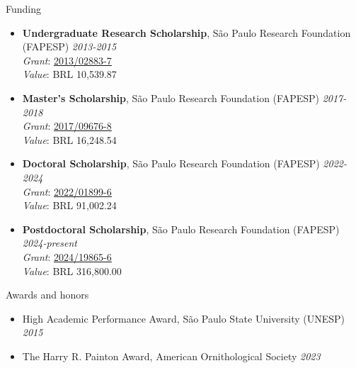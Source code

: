\documentclass{resume}
\begin{document}

\begin{rSection}{Funding} 
\begin{itemize}
\item {\bf Undergraduate Research Scholarship}{, São Paulo Research Foundation (FAPESP)
} \hfill{\em 2013-2015}\\
{\it Grant}: \href{https://bv.fapesp.br/en/bolsas/142421/effect-of-fragmentation-on-the-persistence-of-anuran-amphibians-amphibia-anura-within-the-atlanti/}{\underline{2013/02883-7}}\\
{\it Value}: BRL 10,539.87

\item {\bf Master's Scholarship}{, São Paulo Research Foundation (FAPESP)
} \hfill{\em 2017-2018}\\
{\it Grant}: \href{https://bv.fapesp.br/en/bolsas/172826/effect-of-landscape-modifications-and-climate-changes-on-the-persistence-of-amphibians-in-the-atlant/}{\underline{2017/09676-8}}\\
{\it Value}: BRL 16,248.54

\item {\bf Doctoral Scholarship}{, São Paulo Research Foundation (FAPESP)
} \hfill{\em 2022-2024}\\
{\it Grant}: \href{https://bv.fapesp.br/en/bolsas/203713/landscape-structure-as-a-predictor-of-taxonomic-and-functional-diversity-of-amphibians-in-the-atlant/}{\underline{2022/01899-6}}\\
{\it Value}: BRL 91,002.24

\item {\bf Postdoctoral Scholarship}{, São Paulo Research Foundation (FAPESP)
} \hfill{\em 2024-present}\\
{\it Grant}: \href{https://bv.fapesp.br/en/bolsas/223203/impacts-of-edge-effects-fire-and-climate-change-on-vegetation-composition-and-functional-diversity-a/}{\underline{2024/19865-6}}\\
{\it Value}: BRL 316,800.00
\end{itemize}
\end{rSection}


\begin{rSection}{Awards and honors} 
\begin{itemize}
\item {High Academic Performance Award, São Paulo State University (UNESP)} \hfill{\em 2015}
\item {The Harry R. Painton Award, American Ornithological Society} \hfill{\em 2023}
\end{itemize}
\end{rSection}
\end{document}
